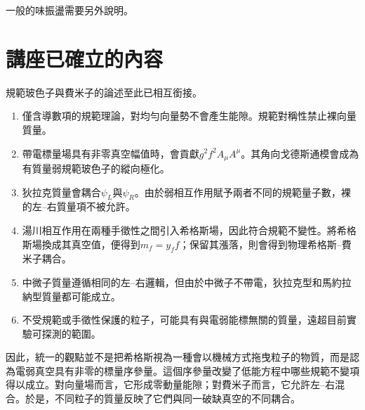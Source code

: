 \begin{classroomqa}
\end{classroomqa}

一般的味振盪需要另外說明。

\begin{classroomqa}
\end{classroomqa}

\section{講座已確立的內容}

規範玻色子與費米子的論述至此已相互銜接。

\begin{enumerate}
  \item 僅含導數項的規範理論，對均勻向量勢不會產生能隙。規範對稱性禁止裸向量質量。
  \item 帶電標量場具有非零真空幅值時，會貢獻\(g^2f^2A_\mu A^\mu\)。其角向戈德斯通模會成為有質量弱規範玻色子的縱向極化。
  \item 狄拉克質量會耦合\(\psi_L\)與\(\psi_R\)。由於弱相互作用賦予兩者不同的規範量子數，裸的左--右質量項不被允許。
  \item 湯川相互作用在兩種手徵性之間引入希格斯場，因此符合規範不變性。將希格斯場換成其真空值，便得到\(m_f=y_ff\)；保留其漲落，則會得到物理希格斯--費米子耦合。
  \item 中微子質量遵循相同的左--右邏輯，但由於中微子不帶電，狄拉克型和馬約拉納型質量都可能成立。
  \item 不受規範或手徵性保護的粒子，可能具有與電弱能標無關的質量，遠超目前實驗可探測的範圍。
\end{enumerate}

因此，統一的觀點並不是把希格斯視為一種會以機械方式拖曳粒子的物質，而是認為電弱真空具有非零的標量序參量。這個序參量改變了低能方程中哪些規範不變項得以成立。對向量場而言，它形成零動量能隙；對費米子而言，它允許左--右混合。於是，不同粒子的質量反映了它們與同一破缺真空的不同耦合。